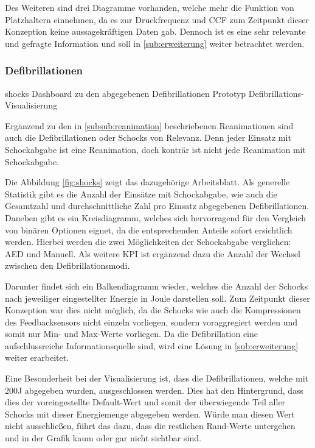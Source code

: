Des Weiteren sind drei Diagramme vorhanden, welche mehr die Funktion von Platzhaltern einnehmen, da es zur Druckfrequenz und \gls{CCF} zum Zeitpunkt dieser Konzeption keine aussagekräftigen Daten gab.
Dennoch ist es eine sehr relevante und gefragte Information und soll in \ref{sub:erweiterung} weiter betrachtet werden.


\subsubsection{Defibrillationen}
\label{subsub:schocks}
\bildbreit
{shocks}
{Dashboard zu den abgegebenen Defibrillationen}
{Prototyp Defibrillations-Visualisierung}

Ergänzend zu den in \ref{subsub:reanimation} beschriebenen Reanimationen sind auch die Defibrillationen oder \glqq Schocks\grqq{} von Relevanz.
Denn jeder Einsatz mit Schockabgabe ist eine Reanimation, doch konträr ist nicht jede Reanimation mit Schockabgabe.

Die Abbildung \ref{fig:shocks} zeigt das dazugehörige Arbeitsblatt.
Als generelle Statistik gibt es die Anzahl der Einsätze mit Schockabgabe, wie auch die Gesamtzahl und durchschnittliche Zahl pro Einsatz abgegebenen Defibrillationen.
Daneben gibt es ein Kreisdiagramm, welches sich hervorragend für den Vergleich von binären Optionen eignet, da die entsprechenden Anteile sofort ersichtlich werden.
Hierbei werden die zwei Möglichkeiten der Schockabgabe verglichen: \gls{AED} und Manuell.
Als weitere \gls{KPI} ist ergänzend dazu die Anzahl der Wechsel zwischen den Defibrillationsmodi.

Darunter findet sich ein Balkendiagramm wieder, welches die Anzahl der Schocks nach jeweiliger eingestellter Energie in Joule darstellen soll.
Zum Zeitpunkt dieser Konzeption war dies nicht möglich, da die Schocks wie auch die Kompressionen des Feedbacksensors nicht einzeln vorliegen, sondern voraggregiert werden und somit nur Min- und Max-Werte vorliegen.
Da die Defibrillation eine aufschlussreiche Informationsquelle sind, wird eine Lösung in \ref{sub:erweiterung} weiter erarbeitet.

Eine Besonderheit bei der Visualisierung ist, dass die Defibrillationen, welche mit 200J abgegeben wurden, ausgeschlossen werden.
Dies hat den Hintergrund, dass dies der voreingestellte Default-Wert und somit der überwiegende Teil aller Schocks mit dieser Energiemenge abgegeben werden.
Würde man diesen Wert nicht ausschließen, führt das dazu, dass die restlichen \glqq Rand\grqq{}-Werte untergehen und in der Grafik kaum oder gar nicht sichtbar sind.

